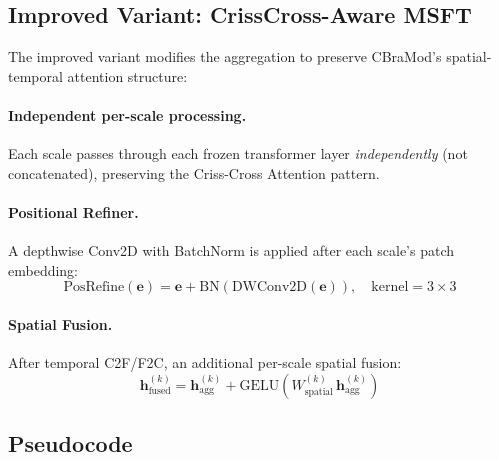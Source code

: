 \documentclass{article}
\begin{document}
\subsection{Improved Variant: CrissCross-Aware MSFT}

The improved variant modifies the aggregation to preserve CBraMod's spatial-temporal attention structure:

\paragraph{Independent per-scale processing.} Each scale passes through each frozen transformer layer \emph{independently} (not concatenated), preserving the Criss-Cross Attention pattern.

\paragraph{Positional Refiner.} A depthwise Conv2D with BatchNorm is applied after each scale's patch embedding:
\begin{equation}
\text{PosRefine}(\bm{e}) = \bm{e} + \text{BN}\!\left(\text{DWConv2D}(\bm{e})\right), \quad \text{kernel} = 3 \times 3
\end{equation}

\paragraph{Spatial Fusion.} After temporal C2F/F2C, an additional per-scale spatial fusion:
\begin{equation}
\bm{h}^{(k)}_\text{fused} = \bm{h}^{(k)}_\text{agg} + \text{GELU}(W^{(k)}_\text{spatial}\, \bm{h}^{(k)}_\text{agg})
\end{equation}

\subsection{Pseudocode}
\end{document}
